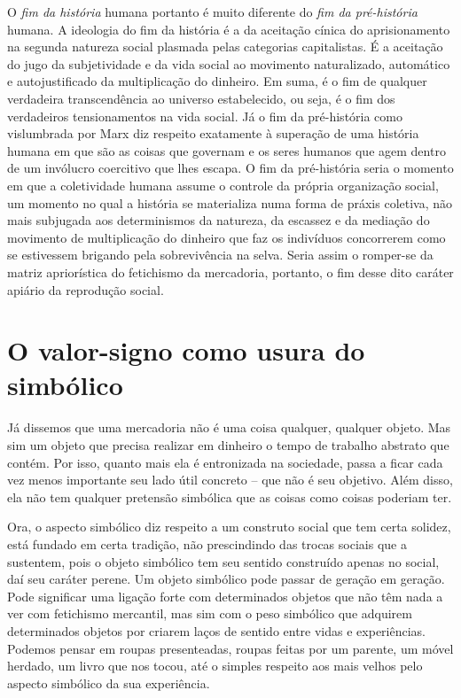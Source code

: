 O \emph{fim da história} humana portanto é muito diferente do \emph{fim
da pré-história} humana. A ideologia do fim da história é a da aceitação
cínica do aprisionamento na segunda natureza social plasmada pelas
categorias capitalistas. É a aceitação do jugo da subjetividade e da
vida social ao movimento naturalizado, automático e autojustificado da
multiplicação do dinheiro. Em suma, é o fim de qualquer verdadeira
transcendência ao universo estabelecido, ou seja, é o fim dos
verdadeiros tensionamentos na vida social. Já o fim da pré-história como
vislumbrada por Marx diz respeito exatamente à superação de uma história
humana em que são as coisas que governam e os seres humanos que agem
dentro de um invólucro coercitivo que lhes escapa. O fim da pré-história
seria o momento em que a coletividade humana assume o controle da
própria organização social, um momento no qual a história se materializa
numa forma de práxis coletiva, não mais subjugada aos determinismos da
natureza, da escassez e da mediação do movimento de multiplicação do
dinheiro que faz os indivíduos concorrerem como se estivessem brigando
pela sobrevivência na selva. Seria assim o romper-se da matriz
apriorística do fetichismo da mercadoria, portanto, o fim desse dito
caráter apiário da reprodução social.

\section{O valor-signo como usura do simbólico}

Já dissemos que uma mercadoria não é uma coisa qualquer, qualquer
objeto. Mas sim um objeto que precisa realizar em dinheiro o tempo de
trabalho abstrato que contém. Por isso, quanto mais ela é entronizada na
sociedade, passa a ficar cada vez menos importante seu lado útil
concreto -- que não é seu objetivo. Além disso, ela não tem qualquer
pretensão simbólica que as coisas como coisas poderiam ter.

Ora, o aspecto simbólico diz respeito a um construto social que tem
certa solidez, está fundado em certa tradição, não prescindindo das
trocas sociais que a sustentem, pois o objeto simbólico tem seu sentido
construído apenas no social, daí seu caráter perene. Um objeto simbólico
pode passar de geração em geração. Pode significar uma ligação forte com
determinados objetos que não têm nada a ver com fetichismo mercantil,
mas sim com o peso simbólico que adquirem determinados objetos por
criarem laços de sentido entre vidas e experiências. Podemos pensar em
roupas presenteadas, roupas feitas por um parente, um móvel herdado, um
livro que nos tocou, até o simples respeito aos mais velhos pelo aspecto
simbólico da sua experiência.


